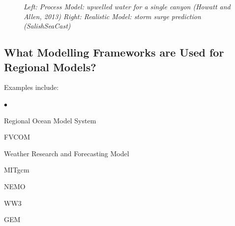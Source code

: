\documentclass[letterpaper,12pt]{article}
\newcounter{lnum}
\newenvironment{abbrevlist}%
  {\begin{list}{$\bullet$}{\setlength{\leftmargin}{2em}%
               \setlength{\itemindent}{0em}%
               \setlength{\itemsep}{0pt}%
               \setlength{\parsep}{0pt}%
               \setlength{\topsep}{2pt}%
               \usecounter{lnum} } }{\end{list}}
\begin{document}
\begin{figure}[h]
\noindent{}
\noindent{}
\label{plt:processrealistic}
\caption{\protect\it{\small Left: Process Model: upwelled water for a single canyon (Howatt and Allen, 2013) Right: Realistic Model: storm surge prediction (SalishSeaCast)}}
\end{figure}

\subsection{What Modelling Frameworks are Used for Regional Models?}

Examples include:
\begin{abbrevlist}
\item Regional Ocean Model System
\item FVCOM
\item Weather Research and Forecasting Model
\item MITgcm
\item NEMO
\item WW3
\item GEM
\end{abbrevlist}
\end{document}
